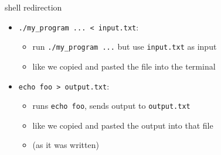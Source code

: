 \usetikzlibrary{matrix,patterns,arrows.meta,decorations.pathreplacing,shapes.misc,fit}

\begin{frame}[fragile,label=redirectExample]{shell redirection}
\begin{itemize}
\item \verb|./my_program ... < input.txt|:
    \begin{itemize}
    \item run \verb|./my_program ...| but use \verb|input.txt| as input
    \item like we copied and pasted the file into the terminal
    \end{itemize}
\vspace{.5cm}
\item \verb|echo foo > output.txt|:
    \begin{itemize}
    \item runs \verb|echo foo|, sends output to \verb|output.txt|
    \item like we copied and pasted the output into that file
    \item (as it was written)
    \end{itemize}
\end{itemize}
\end{frame}


